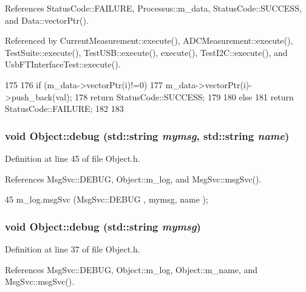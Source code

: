 References StatusCode::FAILURE, Processus::m\_\-data, StatusCode::SUCCESS, and Data::vectorPtr().

Referenced by CurrentMeasurement::execute(), ADCMeasurement::execute(), TestSuite::execute(), TestUSB::execute(), execute(), TestI2C::execute(), and UsbFTInterfaceTest::execute().


\begin{DoxyCode}
175                                         {
176     if (m_data->vectorPtr(i)!=0){
177       m_data->vectorPtr(i)->push_back(val);
178       return StatusCode::SUCCESS;
179     }
180     else {
181       return StatusCode::FAILURE;
182     }
183   }
\end{DoxyCode}
\hypertarget{classObject_a6c9a0397ca804e04d675ed05683f5420}{
\subsubsection[{debug}]{\setlength{\rightskip}{0pt plus 5cm}void Object::debug (std::string {\em mymsg}, \/  std::string {\em name})}}
\label{classObject_a6c9a0397ca804e04d675ed05683f5420}


Definition at line 45 of file Object.h.

References MsgSvc::DEBUG, Object::m\_\-log, and MsgSvc::msgSvc().


\begin{DoxyCode}
45 { m_log.msgSvc (MsgSvc::DEBUG   , mymsg, name ); }
\end{DoxyCode}
\hypertarget{classObject_aac010553f022165573714b7014a15f0d}{
\subsubsection[{debug}]{\setlength{\rightskip}{0pt plus 5cm}void Object::debug (std::string {\em mymsg})}}
\label{classObject_aac010553f022165573714b7014a15f0d}


Definition at line 37 of file Object.h.

References MsgSvc::DEBUG, Object::m\_\-log, Object::m\_\-name, and MsgSvc::msgSvc().

